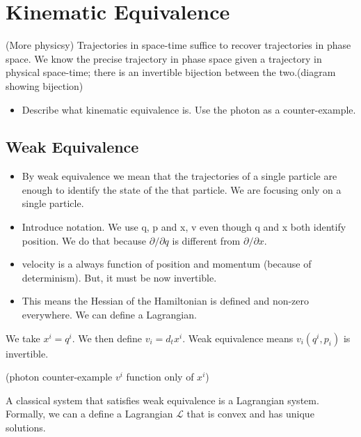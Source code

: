 \documentclass{article}
\begin{document}
\iffalse
\section{Kinematic Equivalence}

\begin{assump}
	(More physicsy) Trajectories in space-time suffice to recover trajectories in phase space. We know the precise trajectory in phase space given a trajectory in physical space-time; there is an invertible bijection between the two.(diagram showing bijection)
\end{assump}

\begin{itemize}
	\item Describe what kinematic equivalence is. Use the photon as a counter-example.
\end{itemize}

\subsection{Weak Equivalence}

\begin{itemize}
	\item By weak equivalence we mean that the trajectories of a single particle are enough to identify the state of the that particle. We are focusing only on a single particle.
	
	\item Introduce notation. We use q, p and x, v even though q and x both identify position. We do that because $\partial/\partial q$ is different from $\partial / \partial x$.
	
	\item velocity is a always function of position and momentum (because of determinism). But, it must be now invertible.
	
	\item This means the Hessian of the Hamiltonian is defined and non-zero everywhere. We can define a Lagrangian.
\end{itemize}

\begin{defn}
	We take $x^i = q^i$. We then define $v_i = d_tx^i$. Weak equivalence means $v_i(q^i, p_i)$ is invertible.
\end{defn}

(photon counter-example $v^i$ function only of $x^i$)

\begin{prop}
	A classical system that satisfies weak equivalence is a Lagrangian system. Formally, we can a define a Lagrangian $\mathcal{L}$ that is convex and has unique solutions.
\end{prop}
\end{document}
